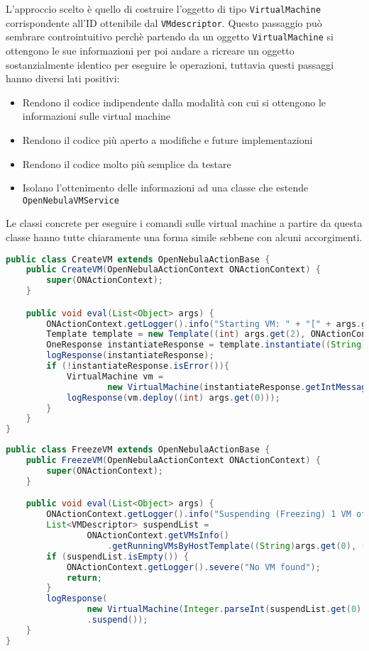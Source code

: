 L'approccio scelto è quello di costruire l'oggetto di tipo \texttt{VirtualMachine} corrispondente all'ID ottenibile dal \texttt{VMdescriptor}. Questo passaggio può sembrare controintuitivo perchè partendo da un oggetto \texttt{VirtualMachine} si ottengono le sue informazioni per poi andare a ricreare un oggetto sostanzialmente identico per eseguire le operazioni, tuttavia questi passaggi hanno diversi lati positivi:
\begin{itemize}
    \item Rendono il codice indipendente dalla modalità con cui si ottengono le informazioni sulle virtual machine
    \item Rendono il codice più aperto a modifiche e future implementazioni
    \item Rendono il codice molto più semplice da testare
    \item Isolano l'ottenimento delle informazioni ad una classe che estende \texttt{OpenNebulaVMService}
\end{itemize}
Le classi concrete per eseguire i comandi sulle virtual machine a partire da questa classe hanno tutte chiaramente una forma simile sebbene con alcuni accorgimenti.
\begin{lstlisting}[language=Java, caption=Classe per avviare una \texttt{VirtualMachine}, label=code:CreateVM, basicstyle=\fontsize{8.5}{13}\ttfamily]
public class CreateVM extends OpenNebulaActionBase {
	public CreateVM(OpenNebulaActionContext ONActionContext) {
		super(ONActionContext);
	}

	public void eval(List<Object> args) {
		ONActionContext.getLogger().info("Starting VM: " + "[" + args.get(2) + ", " + args.get(1) + "]");
		Template template = new Template((int) args.get(2), ONActionContext.getClient());
		OneResponse instantiateResponse = template.instantiate((String) args.get(1));
		logResponse(instantiateResponse);
		if (!instantiateResponse.isError()){
			VirtualMachine vm = 
					new VirtualMachine(instantiateResponse.getIntMessage(), ONActionContext.getClient());
			logResponse(vm.deploy((int) args.get(0)));
		}		
	}
}
\end{lstlisting}
\begin{lstlisting}[language=Java, caption=Classe per freezzare(sospendere) una \texttt{VirtualMachine}, label=code:FreezeVM, basicstyle=\fontsize{8.5}{13}\ttfamily]
public class FreezeVM extends OpenNebulaActionBase {
	public FreezeVM(OpenNebulaActionContext ONActionContext) {
		super(ONActionContext);
	}

	public void eval(List<Object> args) {
		ONActionContext.getLogger().info("Suspending (Freezing) 1 VM of [host, template]: " + "[" + args.get(0) + " " + args.get(2) + "]");
		List<VMDescriptor> suspendList = 
				ONActionContext.getVMsInfo()
                    .getRunningVMsByHostTemplate((String)args.get(0), (String)args.get(2));
		if (suspendList.isEmpty()) {
			ONActionContext.getLogger().severe("No VM found");
            return;
        }
		logResponse(
				new VirtualMachine(Integer.parseInt(suspendList.get(0).getVmId()), ONActionContext.getClient())
				.suspend());
	}
}
\end{lstlisting}


